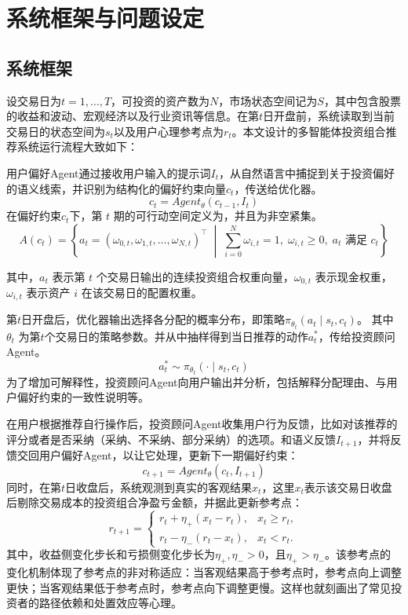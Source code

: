 \chapter{系统框架与问题设定}
\section{系统框架}
设交易日为$t=1 ,\dots ,T$，可投资的资产数为$N$，市场状态空间记为$S$，其中包含股票的收益和波动、宏观经济以及行业资讯等信息。在第$t$日开盘前，系统读取到当前交易日的状态空间为$s_t$以及用户心理参考点为$r_t$。本文设计的多智能体投资组合推荐系统运行流程大致如下：

用户偏好Agent通过接收用户输入的提示词$I_t$，从自然语言中捕捉到关于投资偏好的语义线索，并识别为结构化的偏好约束向量$c_t$，传送给优化器。
\begin{equation}
c_t=Agent_{\theta}(c_{t-1},I_t)
\end{equation}
在偏好约束$c_t$下，第 $t$ 期的可行动空间定义为，并且为非空紧集。
\begin{equation}
A(c_t)
=
\left\{
a_t=(\omega_{0,t},\omega_{1,t},\dots,\omega_{N,t})^\top
\;\middle|\;
\sum_{i=0}^N \omega_{i,t}=1,\;\omega_{i,t} \ge 0,\;
a_t \text{ 满足 } c_t
\right\}
\end{equation}

其中，$a_t$ 表示第 $t$ 个交易日输出的连续投资组合权重向量，$\omega_{0,t}$ 表示现金权重，$\omega_{i,t}$ 表示资产 $i$ 在该交易日的配置权重。

第$t$日开盘后，优化器输出选择各分配的概率分布，即策略$\pi_{\theta_t}(a_t \mid s_t, c_t)$。
其中 $\theta_t$ 为第$t$个交易日的策略参数。并从中抽样得到当日推荐的动作$a^*_t$，传给投资顾问Agent。
\begin{equation}
a_t^* \sim \pi_{\theta_t}(\cdot \mid s_t,c_t)
\end{equation}
为了增加可解释性，投资顾问Agent向用户输出并分析，包括解释分配理由、与用户偏好约束的一致性说明等。

在用户根据推荐自行操作后，投资顾问Agent收集用户行为反馈，比如对该推荐的评分或者是否采纳（采纳、不采纳、部分采纳）的选项。和语义反馈$I_{t+1}$，并将反馈交回用户偏好Agent，以让它处理，更新下一期偏好约束：
\begin{equation}
c_{t+1}=Agent_\theta(c_t,I_{t+1})
\end{equation}
同时，在第$t$日收盘后，系统观测到真实的客观结果$x_t$，这里$x_t$表示该交易日收盘后剔除交易成本的投资组合净盈亏金额，并据此更新参考点：
\begin{equation}
r_{t+1}
=
\begin{cases}
r_t+\eta_+\left(x_t-r_t\right), & x_t\ge r_t,\\[4pt]
r_t-\eta_-\left(r_t-x_t\right), & x_t<r_t.
\end{cases}
\end{equation}
其中，收益侧变化步长和亏损侧变化步长为$\eta_+,\eta_->0$，且$\eta_+>\eta_-$。该参考点的变化机制体现了参考点的非对称适应：当客观结果高于参考点时，参考点向上调整更快；当客观结果低于参考点时，参考点向下调整更慢。这样也就刻画出了常见投资者的路径依赖和处置效应等心理。

